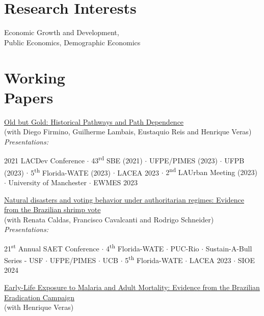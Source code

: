 \documentclass[mm, 10pt]{simple_style}
\begin{document}
\begin{resume}
\section{Research Interests}

Economic Growth and Development,   \\
Public Economics, Demographic Economics


\section{Working \\ Papers \\ {\protect\footnotesize {}}}

\href{https://papers.ssrn.com/sol3/papers.cfm?abstract_id=4513384}{Old but Gold: Historical Pathways and Path Dependence} \\
(with Diego Firmino, Guilherme Lambais, Eustaquio Reis and Henrique Veras) \\
\textit{Presentations:} 
\begin{minipage}[t]{0.7\textwidth}
2021 LACDev Conference
$\cdot$ 43\textsuperscript{rd} SBE (2021)
$\cdot$ UFPE/PIMES (2023)
$\cdot$ UFPB (2023)
$\cdot$ 5\textsuperscript{th} Florida-WATE (2023)
$\cdot$ {LACEA 2023}
$\cdot$ {2\textsuperscript{nd} LAUrban Meeting (2023)}
$\cdot$ University of Manchester
$\cdot$ {EWMES 2023}
\end{minipage}

\href{https://papers.ssrn.com/sol3/papers.cfm?abstract_id=4249006}{Natural disasters and voting behavior under authoritarian regimes: Evidence from the Brazilian shrimp vote} \\
(with Renata Caldas, Francisco Cavalcanti and Rodrigo Schneider) \\
\textit{Presentations:} 
\begin{minipage}[t]{0.7\textwidth}
 21\textsuperscript{st} Annual SAET Conference 
 $\cdot$ 4\textsuperscript{th} Florida-WATE 
 $\cdot$ PUC-Rio 
 $\cdot$ Sustain-A-Bull Series - USF 
 $\cdot$ UFPE/PIMES 
 $\cdot$ UCB 
 $\cdot$ 5\textsuperscript{th} Florida-WATE
 $\cdot$ {LACEA 2023} 
 $\cdot$ {\color{gray} SIOE 2024}
\end{minipage}

\href{https://drive.google.com/file/d/1dIZK5thBKYu-IsduU5E65SdG_z4sQW8h/view}{Early-Life Exposure to Malaria and Adult Mortality: Evidence from the Brazilian Eradication Campaign}\\
(with Henrique Veras)


\end{resume}
\end{document}
